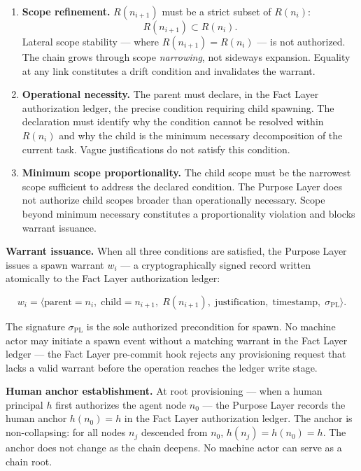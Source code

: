 \begin{enumerate}
    \item[(P1)] \textbf{Scope refinement.} $R(n_{i+1})$ must be a strict subset of $R(n_i)$:
    \begin{equation}
    R(n_{i+1}) \subset R(n_i).
    \label{eq:rs-scope-refinement}
    \end{equation}
    Lateral scope stability — where $R(n_{i+1}) = R(n_i)$ — is not authorized. The chain grows through scope \emph{narrowing}, not sideways expansion. Equality at any link constitutes a drift condition and invalidates the warrant.

    \item[(P2)] \textbf{Operational necessity.} The parent must declare, in the Fact Layer authorization ledger, the precise condition requiring child spawning. The declaration must identify why the condition cannot be resolved within $R(n_i)$ and why the child is the minimum necessary decomposition of the current task. Vague justifications do not satisfy this condition.

    \item[(P3)] \textbf{Minimum scope proportionality.} The child scope must be the narrowest scope sufficient to address the declared condition. The Purpose Layer does not authorize child scopes broader than operationally necessary. Scope beyond minimum necessary constitutes a proportionality violation and blocks warrant issuance.
\end{enumerate}

\medskip
\noindent\textbf{Warrant issuance.} When all three conditions are satisfied, the Purpose Layer issues a spawn warrant $w_i$ — a cryptographically signed record written atomically to the Fact Layer authorization ledger:

\begin{equation}
w_i = \bigl\langle
\text{parent}=n_i,\;
\text{child}=n_{i+1},\;
R(n_{i+1}),\;
\text{justification},\;
\text{timestamp},\;
\sigma_{\text{PL}}
\bigr\rangle .
\label{eq:spawn-warrant}
\end{equation}

The signature $\sigma_{\text{PL}}$ is the sole authorized precondition for spawn. No machine actor may initiate a spawn event without a matching warrant in the Fact Layer ledger — the Fact Layer pre-commit hook rejects any provisioning request that lacks a valid warrant before the operation reaches the ledger write stage.

\medskip
\noindent\textbf{Human anchor establishment.} At root provisioning — when a human principal $h$ first authorizes the agent node $n_0$ — the Purpose Layer records the human anchor $h(n_0) = h$ in the Fact Layer authorization ledger. The anchor is non-collapsing: for all nodes $n_j$ descended from $n_0$, $h(n_j) = h(n_0) = h$. The anchor does not change as the chain deepens. No machine actor can serve as a chain root.

